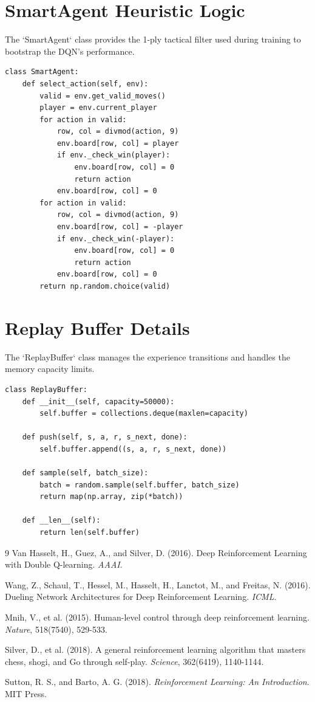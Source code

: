 \documentclass[9pt,a4paper,twocolumn,twoside]{rho-class/rho}
\begin{document}
\section{SmartAgent Heuristic Logic}
The `SmartAgent` class provides the 1-ply tactical filter used during training to bootstrap the DQN's performance.

\begin{verbatim}
class SmartAgent:
    def select_action(self, env):
        valid = env.get_valid_moves()
        player = env.current_player
        for action in valid:
            row, col = divmod(action, 9)
            env.board[row, col] = player
            if env._check_win(player):
                env.board[row, col] = 0
                return action
            env.board[row, col] = 0
        for action in valid:
            row, col = divmod(action, 9)
            env.board[row, col] = -player
            if env._check_win(-player):
                env.board[row, col] = 0
                return action
            env.board[row, col] = 0
        return np.random.choice(valid)
\end{verbatim}

\section{Replay Buffer Details}
The `ReplayBuffer` class manages the experience transitions and handles the memory capacity limits.

\begin{verbatim}
class ReplayBuffer:
    def __init__(self, capacity=50000):
        self.buffer = collections.deque(maxlen=capacity)

    def push(self, s, a, r, s_next, done):
        self.buffer.append((s, a, r, s_next, done))

    def sample(self, batch_size):
        batch = random.sample(self.buffer, batch_size)
        return map(np.array, zip(*batch))

    def __len__(self):
        return len(self.buffer)
\end{verbatim}

\begin{thebibliography}{9}
Van Hasselt, H., Guez, A., and Silver, D. (2016). Deep Reinforcement Learning with Double Q-learning. \textit{AAAI}.

Wang, Z., Schaul, T., Hessel, M., Hasselt, H., Lanctot, M., and Freitas, N. (2016). Dueling Network Architectures for Deep Reinforcement Learning. \textit{ICML}.

Mnih, V., et al. (2015). Human-level control through deep reinforcement learning. \textit{Nature}, 518(7540), 529-533.

Silver, D., et al. (2018). A general reinforcement learning algorithm that masters chess, shogi, and Go through self-play. \textit{Science}, 362(6419), 1140-1144.

Sutton, R. S., and Barto, A. G. (2018). \textit{Reinforcement Learning: An Introduction}. MIT Press.
\end{thebibliography}
\end{document}
